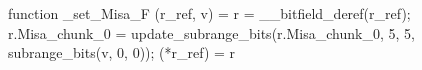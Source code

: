function _set_Misa_F (r_ref, v) = {
    r = __bitfield_deref(r_ref);
    r.Misa_chunk_0 = update_subrange_bits(r.Misa_chunk_0, 5, 5, subrange_bits(v, 0, 0));
    (*r_ref) = r
}
